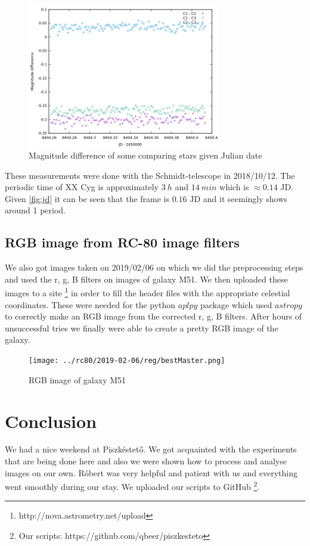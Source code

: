 \documentclass[a4paper,12pt]{article}
\begin{document}
\begin{figure}[H]
    \centering
    \includegraphics[width=0.75\textwidth]{../PSCH-20181012/psch/20181012/mag-jd-comp.png}
    \caption{Magnitude difference of some comparing stars given Julian date}
\end{figure}

\par These measurements were done with the Schmidt-telescope in 2018/10/12. The periodic time of
XX Cyg is approximately $3~h$ and $14~min$ which is $\approx 0.14$ JD. Given \ref{fig:jd} it can be seen that the frame
is $0.16$ JD and it seemingly shows around 1 period.

\subsection{RGB image from RC-80 image filters}

\par We also got images taken on 2019/02/06 on which we did the preprocessing steps and used the
r, g, B filters on images of galaxy M51. We then uploaded these images to a site \footnote{http://nova.astrometry.net/upload}
in order to fill the header files with the appropriate celestial coordinates. These were needed for the
python $aplpy$ package which used $astropy$ to correctly make an RGB image from the corrected r, g, B 
filters. After hours of unsuccessful tries we finally were able to create a pretty RGB image 
of the galaxy.

\vspace{0.6cm}

\begin{figure}[H]
    \centering
    \texttt{[image: ../rc80/2019-02-06/reg/bestMaster.png]}
    \caption{RGB image of galaxy M51}
\end{figure}

\newpage

\section{Conclusion}

\par We had a nice weekend at Piszkéstető. We got acquainted with the
experiments that are being done here and also we were shown how to process
and analyse images on our own. Róbert was very helpful and patient with us
and everything went smoothly during our stay. We uploaded our scripts to GitHub 
\footnote{Our scripts: https://github.com/qbeer/piszkesteto}.
\end{document}

